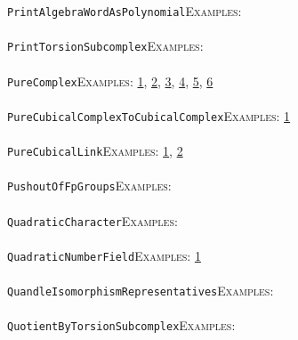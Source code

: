 \documentclass[a4paper,11pt]{report}
\begin{document}
{{ \texttt{PrintAlgebraWordAsPolynomial}{\nobreakspace}{\nobreakspace}{\nobreakspace}{\nobreakspace}\textsc{Examples:} \\
 \\
 \texttt{PrintTorsionSubcomplex}{\nobreakspace}{\nobreakspace}{\nobreakspace}{\nobreakspace}\textsc{Examples:} \\
 \\
 \texttt{PureComplex}{\nobreakspace}{\nobreakspace}{\nobreakspace}{\nobreakspace}\textsc{Examples:} \href{tutorial/chap2.html} {1}{\nobreakspace}, \href{tutorial/chap3.html} {2}{\nobreakspace}, \href{../www/SideLinks/About/aboutPeripheral.html} {3}{\nobreakspace}, \href{../www/SideLinks/About/aboutCoveringSpaces.html} {4}{\nobreakspace}, \href{../www/SideLinks/About/aboutCoverinSpaces.html} {5}{\nobreakspace}, \href{../www/SideLinks/About/aboutCubical.html} {6}{\nobreakspace} \\
 \\
 \texttt{PureCubicalComplexToCubicalComplex}{\nobreakspace}{\nobreakspace}{\nobreakspace}{\nobreakspace}\textsc{Examples:} \href{../www/SideLinks/About/aboutCubical.html} {1}{\nobreakspace} \\
 \\
 \texttt{PureCubicalLink}{\nobreakspace}{\nobreakspace}{\nobreakspace}{\nobreakspace}\textsc{Examples:} \href{tutorial/chap3.html} {1}{\nobreakspace}, \href{../www/SideLinks/About/aboutCoverinSpaces.html} {2}{\nobreakspace} \\
 \\
 \texttt{PushoutOfFpGroups}{\nobreakspace}{\nobreakspace}{\nobreakspace}{\nobreakspace}\textsc{Examples:} \\
 \\
 \texttt{QuadraticCharacter}{\nobreakspace}{\nobreakspace}{\nobreakspace}{\nobreakspace}\textsc{Examples:} \\
 \\
 \texttt{QuadraticNumberField}{\nobreakspace}{\nobreakspace}{\nobreakspace}{\nobreakspace}\textsc{Examples:} \href{tutorial/chap10.html} {1}{\nobreakspace} \\
 \\
 \texttt{QuandleIsomorphismRepresentatives}{\nobreakspace}{\nobreakspace}{\nobreakspace}{\nobreakspace}\textsc{Examples:} \\
 \\
 \texttt{QuotientByTorsionSubcomplex}{\nobreakspace}{\nobreakspace}{\nobreakspace}{\nobreakspace}\textsc{Examples:} \\
 \\
}}
\end{document}

